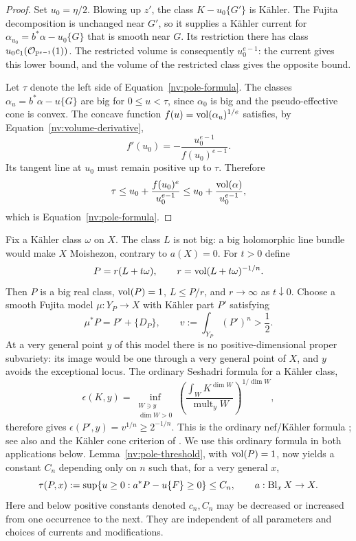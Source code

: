 \begin{proof}
Set \(u_0=\eta/2\).  Blowing up \(z'\), the class
\(K-u_0\{G'\}\) is Kähler.  The Fujita decomposition is unchanged near
\(G'\), so it supplies a Kähler current for
\(\alpha_{u_0}=b^*\alpha-u_0\{G\}\) that is smooth near \(G\).
Its restriction there has class \(u_0c_1(\mathcal O_{\mathbb P^{e-1}}(1))\).
The restricted volume is consequently \(u_0^{e-1}\): the current gives
this lower bound, and the volume of the restricted class gives the
opposite bound.

Let \(\tau\) denote the left side of Equation~\eqref{nv:pole-formula}.  The classes
\(\alpha_u=b^*\alpha-u\{G\}\) are big for \(0\le u<\tau\), since
\(\alpha_0\) is big and the pseudo-effective cone is convex.  The
concave function \(f(u)=\operatorname{vol}(\alpha_u)^{1/e}\) satisfies, by
Equation~\eqref{nv:volume-derivative},
\[
 f'(u_0)=-\frac{u_0^{e-1}}{f(u_0)^{e-1}}.
\]
Its tangent line at \(u_0\) must remain positive up to \(\tau\).
Therefore
\[
 \tau\le u_0+\frac{f(u_0)^e}{u_0^{e-1}}
 \le u_0+\frac{\operatorname{vol}(\alpha)}{u_0^{e-1}},
\]
which is Equation~\eqref{nv:pole-formula}.
\end{proof}

Fix a Kähler class \(\omega\) on \(X\).  The class \(L\) is not big:
a big holomorphic line bundle would make \(X\) Moishezon, contrary to
\(a(X)=0\).  For \(t>0\) define
\begin{equation}\label{nv:normalization}
 P=r(L+t\omega),\qquad
 r=\operatorname{vol}(L+t\omega)^{-1/n}.
\end{equation}
Then \(P\) is a big real class, \(\operatorname{vol}(P)=1\), \(L\le P/r\), and
\(r\to\infty\) as \(t\downarrow0\).  Choose a smooth Fujita model
\(\mu:Y_P\to X\) with Kähler part \(P'\) satisfying
\begin{equation}\label{nv:P-prime}
 \mu^*P=P'+\{D_P\},\qquad v:=\int_{Y_P}(P')^n>\frac12.
\end{equation}
At a very general point \(y\) of this model there is no
positive-dimensional proper subvariety: its image would be one through a
very general point of \(X\), and \(y\) avoids the exceptional locus.
The ordinary Seshadri formula for a Kähler class,
\[
 \epsilon(K,y)
  =\inf_{\substack{W\ni y\\ \dim W>0}}
       \left(\frac{\int_W K^{\dim W}}
       {\operatorname{mult}_y W}\right)^{1/\dim W},
\]
therefore gives \(\epsilon(P',y)=v^{1/n}\ge2^{-1/n}\).
This is the ordinary nef/Kähler formula
\cite[Theorem~2.8]{Tosatti2016}; see also
\cite[Equation~(1.5)]{CollinsTosatti2018} and the
Kähler cone criterion of \cite{DemaillyPaun2004}.  We use this ordinary
formula in both applications below.  Lemma~\ref{nv:pole-threshold}, with
\(\operatorname{vol}(P)=1\), now yields a constant \(C_n\) depending only on \(n\)
such that, for a very general \(x\),
\begin{equation}\label{nv:point-bound}
 \tau(P,x):=\sup\{u\ge0:a^*P-u\{F\}\ge0\}\le C_n,
 \qquad a:\operatorname{Bl}_xX\to X.
\end{equation}
Here and below positive constants denoted \(c_n,C_n\) may be decreased or
increased from one occurrence to the next.  They are independent of all
parameters and choices of currents and modifications.

